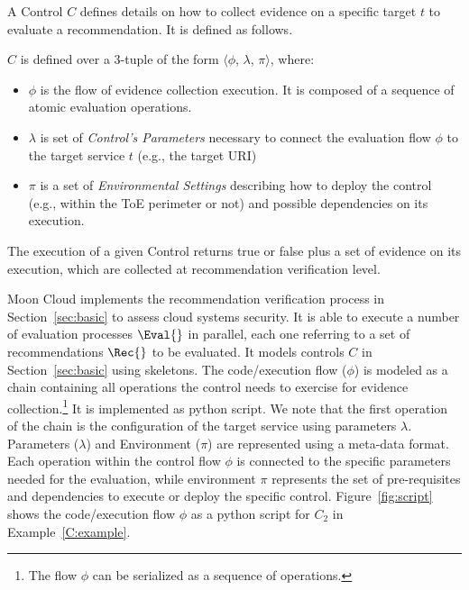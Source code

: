 \documentclass[../main.tex]{subfiles}
\begin{document}
A Control $C$ defines details on how to collect evidence on a specific target $t$ to evaluate a recommendation. It is defined as follows.
\begin{definition}[$C$]\label{def:control}
$C$ is defined over a 3-tuple of the form $\langle$$\phi$, $\lambda$, $\pi$$\rangle$, where:
\begin{itemize}
	\item $\phi$ is the flow of evidence collection execution. It is composed of a sequence of atomic evaluation operations.
	\item $\lambda$ is set of \textit{Control's Parameters} necessary to connect the evaluation flow $\phi$ to the target service $t$ (e.g., the target URI)
	\item $\pi$ is a set of \textit{Environmental Settings} describing how to deploy the control (e.g., within the ToE perimeter or not) and possible dependencies on its execution. 
\end{itemize}
\end{definition}

The execution of a given Control returns true or false plus a set of evidence on its execution, which are collected at recommendation verification level.



Moon Cloud implements the recommendation verification process in Section~\ref{sec:basic} to assess cloud systems security. 
It is able to execute a number of evaluation processes $\Eval{}$ in parallel, each one referring to a set of recommendations $\Rec{}$ to be evaluated. 
It models controls $C$ in Section~\ref{sec:basic} using skeletons. The code/execution flow ($\phi$) is modeled as a chain containing all operations the control needs to exercise for evidence collection.\footnote{The flow $\phi$ can be serialized as a sequence of operations.} It is implemented as python script. We note that the first operation of the chain is the configuration of the target service using parameters $\lambda$. 
Parameters ($\lambda$) and Environment ($\pi$) are represented using a meta-data format. Each operation within the control flow $\phi$ is connected to the specific parameters needed for the evaluation, while environment $\pi$ represents the set of pre-requisites and dependencies to execute or deploy the specific control. Figure~\ref{fig:script} shows the code/execution flow $\phi$ as a python script for $C_{2}$ in Example~\ref{C:example}.
\end{document}
